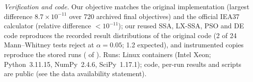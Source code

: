 \emph{Verification and code.} Our objective matches the original implementation (largest difference $8.7\times10^{-11}$ over 720 archived final objectives) and the official IEA37 calculator (relative difference ${<}10^{-11}$); our reused SSA, LX-SSA, PSO and DE code reproduces the recorded result distributions of the original code (2 of 24 Mann--Whitney tests reject at $\alpha=0.05$; 1.2 expected), and instrumented copies reproduce the stored runs (\NDVerStoredMatch{} of \NDVerRuns). Runs: Linux containers (Intel Xeon; Python~3.11.15, NumPy~2.4.6, SciPy~1.17.1); code, per-run results and scripts are public (see the data availability statement).

